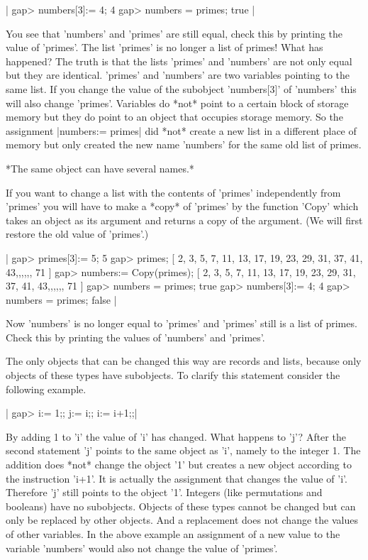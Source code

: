 |    gap> numbers[3]:= 4;
    4
    gap> numbers = primes;
    true |

You  see that  'numbers'  and  'primes' are  still  equal, check  this by
printing the value of 'primes'.  The list 'primes' is no longer a list of
primes!   What has happened?  The truth  is that the  lists  'primes' and
'numbers'  are not  only  equal  but  they  are identical.   'primes' and
'numbers' are two variables pointing to the same list.  If you change the
value of the subobject 'numbers[3]' of 'numbers'  this will  also  change
'primes'.   Variables do *not* point to a certain block of storage memory
but they  do point  to an  object  that occupies storage  memory.  So the
assignment |numbers:= primes| did *not* create a new list in  a different
place of memory but only  created the new name 'numbers' for the same old
list of primes.

*The same object can have several names.*

If  you want to change a list with the contents of 'primes' independently
from 'primes' you will have to  make a *copy* of 'primes' by the function
'Copy'  which takes an object as its argument  and returns a copy  of the
argument.  (We will first restore the old value of 'primes'.)

|    gap> primes[3]:= 5;
    5
    gap> primes;
    [ 2, 3, 5, 7, 11, 13, 17, 19, 23, 29, 31, 37, 41, 43,,,,,, 71 ]
    gap> numbers:= Copy(primes);
    [ 2, 3, 5, 7, 11, 13, 17, 19, 23, 29, 31, 37, 41, 43,,,,,, 71 ]
    gap> numbers = primes;
    true
    gap> numbers[3]:= 4;
    4
    gap> numbers = primes;
    false |

Now 'numbers' is no longer equal to 'primes' and 'primes' still is a list
of primes.  Check this by printing the values of 'numbers' and 'primes'.

The  only objects  that can be  changed  this way  are records and lists,
because only {\GAP} objects of  these  types have subobjects.  To clarify
this statement consider the following example.

|    gap> i:= 1;; j:= i;; i:= i+1;;|

By adding 1 to 'i' the value of 'i' has  changed.   What  happens to 'j'?
After the second statement 'j' points to the same object  as 'i',  namely
to the  integer 1.  The  addition  does *not* change  the object '1'  but
creates a new object according  to the instruction 'i+1'.  It is actually
the assignment that changes the value of 'i'.  Therefore 'j' still points
to  the object '1'.  Integers  (like permutations and  booleans)  have no
subobjects.  Objects  of these types  cannot  be  changed but can only be
replaced by other objects.   And a replacement does not change the values
of other variables.  In the above example an assignment of a new value to
the variable 'numbers' would also not change the value of 'primes'.

